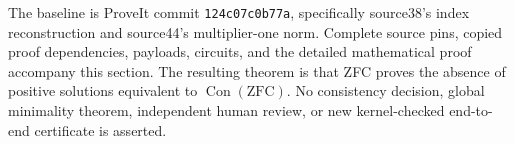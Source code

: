 The baseline is ProveIt commit
\texttt{124c07c0b77a}, specifically source38's
index reconstruction and source44's multiplier-one norm. Complete source
pins, copied proof dependencies, payloads, circuits, and the detailed
mathematical proof accompany this section. The resulting theorem is
that ZFC proves the absence of positive solutions equivalent to
$\operatorname{Con}(\mathrm{ZFC})$. No consistency decision, global
minimality theorem, independent human review, or new kernel-checked
end-to-end certificate is asserted.
